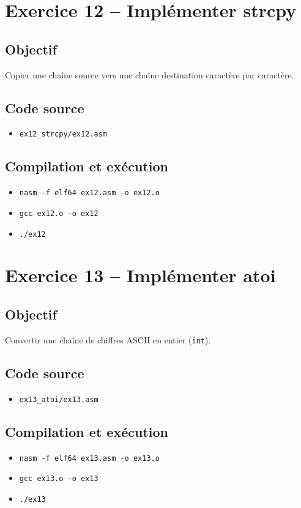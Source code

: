 \documentclass[11pt]{article}
\begin{document}
\section{Exercice 12 -- Implémenter strcpy}
\subsection*{Objectif}
Copier une chaîne source vers une chaîne destination caractère par caractère.

\subsection*{Code source}
\begin{itemize}[noitemsep]
    \item \texttt{ex12\_strcpy/ex12.asm}
\end{itemize}

\subsection*{Compilation et exécution}
\begin{itemize}[noitemsep]
    \item \texttt{nasm -f elf64 ex12.asm -o ex12.o}
    \item \texttt{gcc ex12.o -o ex12}
    \item \texttt{./ex12}
\end{itemize}

\section{Exercice 13 -- Implémenter atoi}
\subsection*{Objectif}
Convertir une chaîne de chiffres ASCII en entier (\texttt{int}).

\subsection*{Code source}
\begin{itemize}[noitemsep]
    \item \texttt{ex13\_atoi/ex13.asm}
\end{itemize}

\subsection*{Compilation et exécution}
\begin{itemize}[noitemsep]
    \item \texttt{nasm -f elf64 ex13.asm -o ex13.o}
    \item \texttt{gcc ex13.o -o ex13}
    \item \texttt{./ex13}
\end{itemize}
\end{document}

